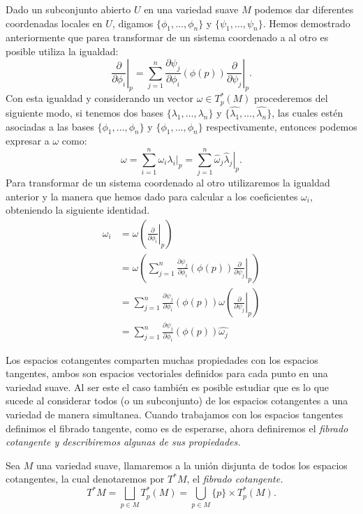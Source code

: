 Dado un subconjunto abierto $U$ en una variedad suave $M$ podemos dar diferentes coordenadas locales en $U$, digamos $\{\phi_1,\ldots,\phi_n\}$ y $\{\psi_1,\ldots,\psi_n\}$. Hemos demostrado anteriormente que parea transformar de un sistema coordenado a al otro es posible utiliza la igualdad:
\[
	\left. \frac{\partial}{\partial \phi_i} \right|_p =
	\sum_{j=1}^{n} \left. \frac{\partial \psi_j}{\partial \phi_i} (\phi(p))
	\frac{\partial}{\partial \psi_j} \right|_{p}.
\]
Con esta igualdad y considerando un vector $\omega \in T_{p}^{*}(M)$ procederemos del siguiente modo, si tenemos dos bases $\{\lambda_1,\ldots,\lambda_n\}$ y $\{\hat{\lambda_1},\ldots,\hat{\lambda_n}\}$, las cuales estén asociadas a las bases $\{\phi_1, \ldots, \phi_n\}$ y $\{\phi_1, \ldots, \phi_n\}$ respectivamente, entonces podemos expresar a $\omega$ como:
\[
	\omega = \sum_{i=1}^{n} \left. \omega_i \lambda_i \right|_p
	= \sum_{j=1}^{n} \left. \hat{\omega}_j \hat{\lambda}_j \right|_p.
\]
Para transformar de un sistema coordenado al otro utilizaremos la igualdad anterior y la manera que hemos dado para calcular a los coeficientes $\omega_i$, obteniendo la siguiente identidad.
\begin{align*}
	\omega_i & = \omega
	\left(
	\left. \frac{\partial}{\partial \phi_i} \right|_{p}
	\right)                                                                       \\
	         & = \omega
	\left(
	\sum_{j=1}^{n} \frac{\partial \psi_j}{\partial \phi_i} (\phi(p))
	\left. \frac{\partial}{\partial \psi_j}\right|_{p} \right)                    \\
	         & = \sum_{j=1}^{n} \frac{\partial \psi_j}{\partial \phi_i} (\phi(p))
	\omega \left( \left. \frac{\partial}{\partial \psi_j}\right|_{p} \right)      \\
	         & = \sum_{j=1}^{n} \frac{\partial \psi_j}{\partial \phi_i} (\phi(p))
	\hat{\omega_j}
\end{align*}

Los espacios cotangentes comparten muchas propiedades con los espacios tangentes, ambos son espacios vectoriales definidos para cada punto en una variedad suave. Al ser este el caso también es posible estudiar que es lo que sucede al considerar todos (o un subconjunto) de los espacios cotangentes a una variedad de manera simultanea. Cuando trabajamos con los espacios tangentes definimos el fibrado tangente, como es de esperarse, ahora definiremos el \it{fibrado cotangente} y describiremos algunas de sus propiedades.

\begin{definition}
	Sea $M$ una variedad suave, llamaremos a la unión disjunta de todos los espacios cotangentes, la cual denotaremos por $T^{*}M$, el \it{fibrado cotangente}.
	\[ T^{*}M = \bigsqcup_{p \in M} T_{p}^{*}(M) = \bigcup_{p \in M} \{p\} \times T_{p}^{*}(M). \]
\end{definition}

